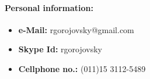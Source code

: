 \paragraph{Personal information:}
\begin{itemize}
\item \textbf{e-Mail:} rgorojovsky@gmail.com 
\item \textbf{Skype Id:} rgorojovsky
\item \textbf{Cellphone no.:} (011)15 3112-5489
\end{itemize}


